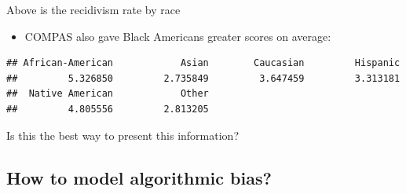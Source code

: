 \documentclass[
]{article}
\newenvironment{Shaded}{\begin{snugshade}}{\end{snugshade}}
\newcommand{\FunctionTok}[1]{\textcolor[rgb]{0.00,0.00,0.00}{#1}}
\newcommand{\NormalTok}[1]{#1}
\newcommand{\SpecialCharTok}[1]{\textcolor[rgb]{0.00,0.00,0.00}{#1}}
\providecommand{\tightlist}{%
  \setlength{\itemsep}{0pt}\setlength{\parskip}{0pt}}
\begin{document}
Above is the recidivism rate by race

\begin{itemize}
\tightlist
\item
  COMPAS also gave Black Americans greater scores on average:
\end{itemize}

\begin{Shaded}
\end{Shaded}

\begin{verbatim}
## African-American            Asian        Caucasian         Hispanic 
##         5.326850         2.735849         3.647459         3.313181 
##  Native American            Other 
##         4.805556         2.813205
\end{verbatim}

Is this the best way to present this information?

\hypertarget{how-to-model-algorithmic-bias}{%
\subsection{How to model algorithmic
bias?}\label{how-to-model-algorithmic-bias}}
\end{document}
